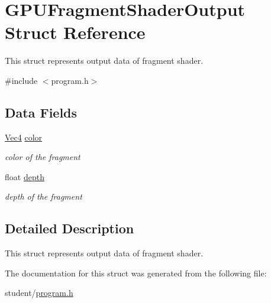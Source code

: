 \hypertarget{structGPUFragmentShaderOutput}{\section{G\-P\-U\-Fragment\-Shader\-Output Struct Reference}
\label{structGPUFragmentShaderOutput}
}


This struct represents output data of fragment shader.  




{\ttfamily \#include $<$program.\-h$>$}

\subsection*{Data Fields}
\begin{DoxyCompactItemize}
\item 
\hypertarget{structGPUFragmentShaderOutput_a209315abb3483aac58aad3954e8ecad1}{\hyperlink{structVec4}{Vec4} \hyperlink{structGPUFragmentShaderOutput_a209315abb3483aac58aad3954e8ecad1}{color}}\label{structGPUFragmentShaderOutput_a209315abb3483aac58aad3954e8ecad1}

\begin{DoxyCompactList}\small\item\em color of the fragment \end{DoxyCompactList}\item 
\hypertarget{structGPUFragmentShaderOutput_aa46a61b8c73bc9766ae2b556bcce62a3}{float \hyperlink{structGPUFragmentShaderOutput_aa46a61b8c73bc9766ae2b556bcce62a3}{depth}}\label{structGPUFragmentShaderOutput_aa46a61b8c73bc9766ae2b556bcce62a3}

\begin{DoxyCompactList}\small\item\em depth of the fragment \end{DoxyCompactList}\end{DoxyCompactItemize}


\subsection{Detailed Description}
This struct represents output data of fragment shader. 

The documentation for this struct was generated from the following file\-:\begin{DoxyCompactItemize}
\item 
student/\hyperlink{program_8h}{program.\-h}\end{DoxyCompactItemize}
